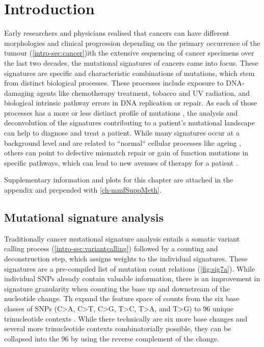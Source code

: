 \section{Introduction}
\label{mmf-sec:intro}

Early researchers and physicians realised that cancers can have different morphologies and clinical progression depending on the primary occurrence of the tumour (\autoref{intro-sec:cancer})ith the extensive sequencing of cancer specimens over the last two decades, the mutational signatures of cancers came into focus. These signatures are specific and characteristic combinations of mutations, which stem from distinct biological processes. These processes include exposure to DNA-damaging agents like chemotherapy treatment, tobacco and UV radiation, and biological intrinsic pathway errors in DNA replication or repair. As each of those processes has a more or less distinct profile of mutations \cite{Hollstein1991,Kucab2019}, the analysis and deconvolution of the signatures contributing to a patient's mutational landscape can help to diagnose and treat a patient. While many signatures occur at a background level and are related to ``normal`` cellular processes like ageing \cite{Alexandrov2013}, others can point to defective mismatch repair or gain of function mutations in specific pathways, which can lead to new avenues of therapy for a patient \cite{Neil2017}.

Supplementary information and plots for this chapter are attached in the appendix and prepended with \ref{ch-mmfSuppMeth}.

\subsection{Mutational signature analysis}
\label{mmf-sec:signatureanalysis}
Traditionally cancer mutational signature analysis entails a somatic variant calling process (\autoref{intro-sec:variantcalling}) followed by a counting and deconstruction step, which assigns weights to the individual signatures. These signatures are a pre-compiled list of mutation count relations (\autoref{fig:sig7a}). While individual SNPs already contain valuable information, there is an improvement in signature granularity when counting the base up and downstream of the nucleotide change. Th expand the feature space of counts from the six base classes of SNPs (C>A, C>T, C>G, T>C, T>A, and T>G) to 96 unique trinucleotide contexts \cite{Alexandrov2013}. While there technically are six more base changes and several  more trinucleotide contexts combinatorially possible, they can be collapsed into the 96  by using the reverse complement of the change.

